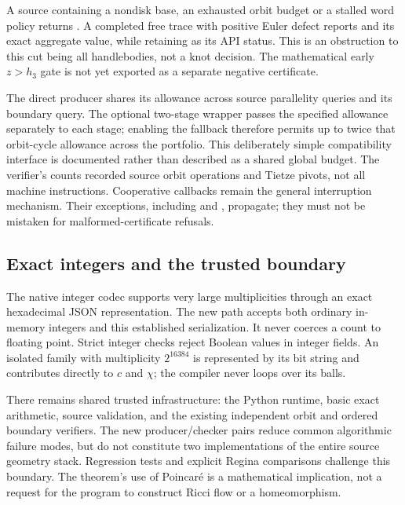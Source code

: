 A source containing a nondisk base, an exhausted orbit budget or a stalled
word policy returns \Inconclusive. A completed free trace with positive Euler
defect reports  and its exact aggregate
value, while retaining \Inconclusive{} as its API status. This is an obstruction
to this cut being all handlebodies, not a knot decision. The mathematical early
$z>h_3$ gate is not yet exported as a separate negative certificate.

The direct producer shares its  allowance across source
parallelity queries and its boundary query. The optional two-stage wrapper
passes the specified allowance separately to each stage; enabling the fallback
therefore permits up to twice that orbit-cycle allowance across the portfolio.
This deliberately simple compatibility interface is documented rather than
described as a shared global budget. The verifier's 
counts recorded source orbit operations and Tietze pivots, not all machine
instructions. Cooperative callbacks remain the general interruption mechanism.
Their exceptions, including  and , propagate;
they must not be mistaken for malformed-certificate refusals.

\subsection{Exact integers and the trusted boundary}

The native integer codec supports very large multiplicities through an exact
hexadecimal JSON representation. The new path accepts both ordinary in-memory
integers and this established serialization. It never coerces a count to
floating point. Strict integer checks reject Boolean values in integer fields.
An isolated family with multiplicity $2^{16384}$ is represented by its bit
string and contributes directly to $c$ and $\chi$; the compiler never loops over
its balls.

There remains shared trusted infrastructure: the Python runtime, basic exact
arithmetic, source validation, and the existing independent orbit and ordered
boundary verifiers. The new producer/checker pairs reduce common algorithmic
failure modes, but do not constitute two implementations of the entire source
geometry stack. Regression tests and explicit Regina comparisons challenge this
boundary. The theorem's use of Poincar\'e is a mathematical implication, not a
request for the program to construct Ricci flow or a homeomorphism.


